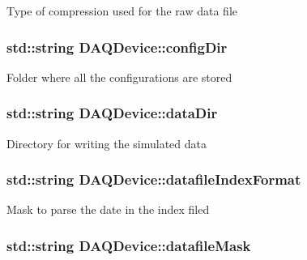 Type of compression used for the raw data file \hypertarget{classDAQDevice_a1fcd353aea74e51801b36d5728f67e66}{
\subsubsection[{config\-Dir}]{\setlength{\rightskip}{0pt plus 5cm}std\-::string D\-A\-Q\-Device\-::config\-Dir\hspace{0.3cm}{\ttfamily [protected]}}}\label{classDAQDevice_a1fcd353aea74e51801b36d5728f67e66}
Folder where all the configurations are stored \hypertarget{classDAQDevice_ae99e0e25b09c03713caac3f9b2baaee8}{
\subsubsection[{data\-Dir}]{\setlength{\rightskip}{0pt plus 5cm}std\-::string D\-A\-Q\-Device\-::data\-Dir\hspace{0.3cm}{\ttfamily [protected]}}}\label{classDAQDevice_ae99e0e25b09c03713caac3f9b2baaee8}
Directory for writing the simulated data \hypertarget{classDAQDevice_a3d221f2cd6d5d903cbaa8c80abe495de}{
\subsubsection[{datafile\-Index\-Format}]{\setlength{\rightskip}{0pt plus 5cm}std\-::string D\-A\-Q\-Device\-::datafile\-Index\-Format\hspace{0.3cm}{\ttfamily [protected]}}}\label{classDAQDevice_a3d221f2cd6d5d903cbaa8c80abe495de}
Mask to parse the date in the index filed \hypertarget{classDAQDevice_ad3cde27a8f45ea3af4495a9d366c31c3}{
\subsubsection[{datafile\-Mask}]{\setlength{\rightskip}{0pt plus 5cm}std\-::string D\-A\-Q\-Device\-::datafile\-Mask\hspace{0.3cm}{\ttfamily [protected]}}}\label{classDAQDevice_ad3cde27a8f45ea3af4495a9d366c31c3}
